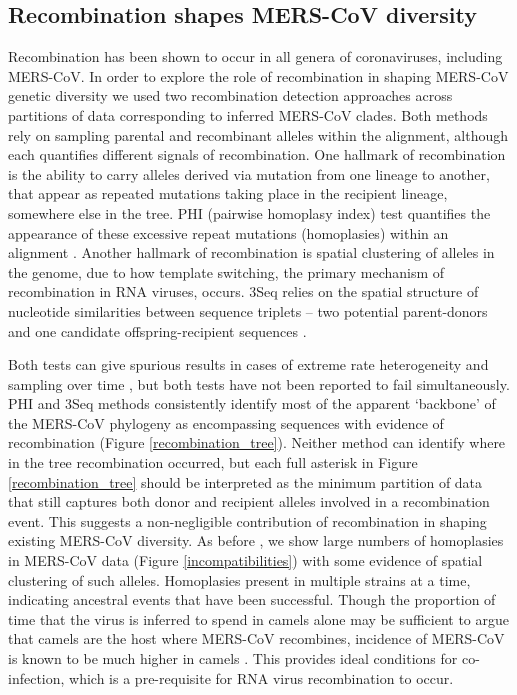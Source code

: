 \documentclass[11pt,oneside,letterpaper]{article}
\begin{document}
\subsection*{Recombination shapes MERS-CoV diversity}
Recombination has been shown to occur in all genera of coronaviruses, including MERS-CoV.
In order to explore the role of recombination in shaping MERS-CoV genetic diversity we used two recombination detection approaches across partitions of data corresponding to inferred MERS-CoV clades.
Both methods rely on sampling parental and recombinant alleles within the alignment, although each quantifies different signals of recombination.
One hallmark of recombination is the ability to carry alleles derived via mutation from one lineage to another, that appear as repeated mutations taking place in the recipient lineage, somewhere else in the tree.
PHI (pairwise homoplasy index) test quantifies the appearance of these excessive repeat mutations (homoplasies) within an alignment \citep{bruen_simple_2006}.
Another hallmark of recombination is spatial clustering of alleles in the genome, due to how template switching, the primary mechanism of recombination in RNA viruses, occurs.
3Seq relies on the spatial structure of nucleotide similarities between sequence triplets -- two potential parent-donors and one candidate offspring-recipient sequences \citep{boni_exact_2007}.

Both tests can give spurious results in cases of extreme rate heterogeneity and sampling over time \citep{dudas_mers-cov_2016}, but both tests have not been reported to fail simultaneously.
PHI and 3Seq methods consistently identify most of the apparent `backbone' of the MERS-CoV phylogeny as encompassing sequences with evidence of recombination (Figure \ref{recombination_tree}).
Neither method can identify where in the tree recombination occurred, but each full asterisk in Figure \ref{recombination_tree} should be interpreted as the minimum partition of data that still captures both donor and recipient alleles involved in a recombination event.
This suggests a non-negligible contribution of recombination in shaping existing MERS-CoV diversity.
As before \citep{dudas_mers-cov_2016}, we show large numbers of homoplasies in MERS-CoV data (Figure \ref{incompatibilities}) with some evidence of spatial clustering of such alleles.
Homoplasies present in multiple strains at a time, indicating ancestral events that have been successful.
Though the proportion of time that the virus is inferred to spend in camels alone may be sufficient to argue that camels are the host where MERS-CoV recombines, incidence of MERS-CoV is known to be much higher in camels \citep{muller_2014,corman_antibodies_2014,chu_2014,reusken_2014,ali_systematic_2017}.
This provides ideal conditions for co-infection, which is a pre-requisite for RNA virus recombination to occur.
\end{document}
